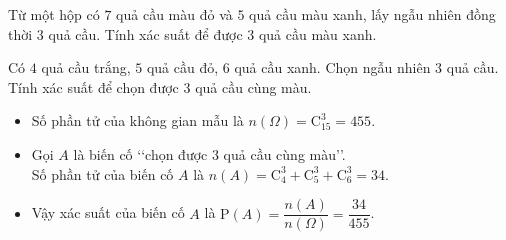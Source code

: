 \begin{vd}
	Từ một hộp có $7$ quả cầu màu đỏ và $5$ quả cầu màu xanh, lấy ngẫu nhiên đồng thời $3$ quả cầu. Tính xác suất để được $3$ quả cầu màu xanh.
\end{vd}
\begin{vd}
	Có $4$ quả cầu trắng, $5$ quả cầu đỏ, $6$ quả cầu xanh. Chọn ngẫu nhiên $3$ quả cầu. Tính xác suất để chọn được $3$ quả cầu cùng màu.
	\loigiai
	{
		\begin{itemize}
			\item Số phần tử của không gian mẫu là $n(\Omega)=\mathrm{C}_{15}^3=455$.
			\item Gọi $A$ là biến cố \lq\lq chọn được $3$ quả cầu cùng màu\rq\rq.\\
			Số phần tử của biến cố $A$ là $n(A)=\mathrm{C}_4^3+\mathrm{C}_5^3+\mathrm{C}_6^3=34$.
			\item Vậy xác suất của biến cố $A$ là $\mathrm{P}(A)=\dfrac{n(A)}{n(\Omega)}=\dfrac{34}{455}$.
		\end{itemize}
	}
\end{vd}

